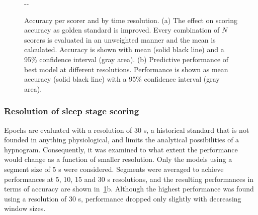 \begin{figure}[tb]
\begin{adjustwidth*}{}{-\marginparwidth-\marginparsep}
    \myfloatalign   
      ~
    \caption[Accuracy per scorer and by time resolution]{Accuracy per scorer and by time resolution. (a) The effect on scoring accuracy as golden standard is improved. Every combination of $N$ scorers is evaluated in an unweighted manner and the mean is calculated. Accuracy is shown with mean (solid black line) and a 95\% confidence interval (gray area). (b) Predictive performance of best model at different resolutions. Performance is shown as mean accuracy (solid black line) with a 95\% confidence interval
(gray area).}
    \label{fig:sleep-stages:paper-iii:figure-01}
\end{adjustwidth*}
\end{figure}

\subsubsection{Resolution of sleep stage scoring}
Epochs are evaluated with a resolution of 30 s, a historical standard that is not founded in anything physiological, and limits the analytical possibilities of a hypnogram.
Consequently, it was examined to what extent the performance would change as a function of smaller resolution.
Only the models using a segment size of 5 s were considered.
Segments were averaged to achieve performances at 5, 10, 15 and 30 s resolutions, and the resulting performances in terms of accuracy are shown in~\cref{fig:sleep-stages:paper-iii:figure-01}b. 
Although the highest performance was found using a resolution of 30 s, performance dropped only slightly with decreasing window sizes.

